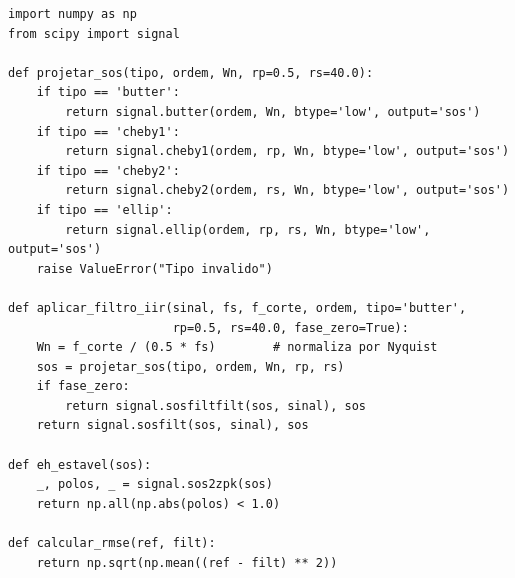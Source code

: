 \documentclass[conference]{IEEEtran}
\begin{document}
\begin{lstlisting}[label=lst:codigo,caption={Núcleo da rotina de filtragem IIR.}]
import numpy as np
from scipy import signal

def projetar_sos(tipo, ordem, Wn, rp=0.5, rs=40.0):
    if tipo == 'butter':
        return signal.butter(ordem, Wn, btype='low', output='sos')
    if tipo == 'cheby1':
        return signal.cheby1(ordem, rp, Wn, btype='low', output='sos')
    if tipo == 'cheby2':
        return signal.cheby2(ordem, rs, Wn, btype='low', output='sos')
    if tipo == 'ellip':
        return signal.ellip(ordem, rp, rs, Wn, btype='low', output='sos')
    raise ValueError("Tipo invalido")

def aplicar_filtro_iir(sinal, fs, f_corte, ordem, tipo='butter',
                       rp=0.5, rs=40.0, fase_zero=True):
    Wn = f_corte / (0.5 * fs)        # normaliza por Nyquist
    sos = projetar_sos(tipo, ordem, Wn, rp, rs)
    if fase_zero:
        return signal.sosfiltfilt(sos, sinal), sos
    return signal.sosfilt(sos, sinal), sos

def eh_estavel(sos):
    _, polos, _ = signal.sos2zpk(sos)
    return np.all(np.abs(polos) < 1.0)

def calcular_rmse(ref, filt):
    return np.sqrt(np.mean((ref - filt) ** 2))
\end{lstlisting}
\end{document}
